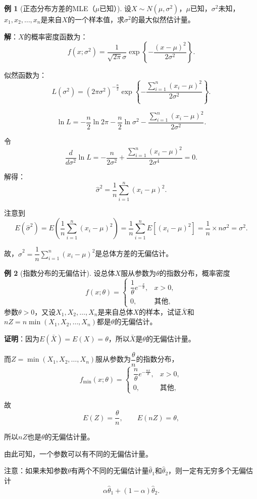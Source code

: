 \documentclass[11pt,a4paper]{report}
\theoremstyle{definition}
\newtheorem{example}{例}[chapter]
\begin{document}
\begin{example}[正态分布方差的MLE（$\mu$已知）]
设$X\sim N(\mu,\sigma^{2})$，$\mu$已知，$\sigma^{2}$未知，$x_{1},x_{2},\ldots,x_{n}$是来自$X$的一个样本值，求$\sigma^{2}$的最大似然估计量。

\textbf{解}：$X$的概率密度函数为：
\[
f(x;\sigma^{2})=\frac{1}{\sqrt{2\pi}\sigma}\exp\left\{-\frac{(x-\mu)^{2}}{2\sigma^{2}}\right\}.
\]

似然函数为：
\[
L(\sigma^{2})=(2\pi\sigma^{2})^{-\frac{n}{2}}\exp\left\{-\frac{\sum_{i=1}^{n}(x_{i}-\mu)^{2}}{2\sigma^{2}}\right\}.
\]

\[
\ln L=-\frac{n}{2}\ln 2\pi-\frac{n}{2}\ln\sigma^{2}-\frac{\sum_{i=1}^{n}(x_{i}-\mu)^{2}}{2\sigma^{2}}.
\]

令
\[
\frac{d}{d\sigma^{2}}\ln L=-\frac{n}{2\sigma^{2}}+\frac{\sum_{i=1}^{n}(x_{i}-\mu)^{2}}{2\sigma^{4}}=0.
\]

解得：
\[
\hat{\sigma}^{2}=\frac{1}{n}\sum_{i=1}^{n}(x_{i}-\mu)^{2}.
\]

注意到
\[
E(\hat{\sigma}^{2})=E\left(\frac{1}{n}\sum_{i=1}^{n}(x_{i}-\mu)^{2}\right)=\frac{1}{n}\sum_{i=1}^{n}E[(x_{i}-\mu)^{2}]=\frac{1}{n}\times n\sigma^{2}=\sigma^{2}.
\]

故，$\hat{\sigma}^{2}=\dfrac{1}{n}\displaystyle\sum_{i=1}^{n}(x_{i}-\mu)^{2}$是总体方差的无偏估计。
\end{example}

\begin{example}[指数分布的无偏估计]
设总体$X$服从参数为$\theta$的指数分布，概率密度
\[
f(x;\theta)=
\begin{cases}
\dfrac{1}{\theta}e^{-\frac{x}{\theta}}, & x>0,\\[0.5em]
0, & \text{其他},
\end{cases}
\]
参数$\theta>0$，又设$X_{1},X_{2},\ldots,X_{n}$是来自总体$X$的样本，试证$\bar{X}$和$nZ=n\min(X_{1},X_{2},\ldots,X_{n})$都是$\theta$的无偏估计。

\textbf{证明}：因为$E(\bar{X})=E(X)=\theta$，所以$\bar{X}$是$\theta$的无偏估计量。

而$Z=\min(X_{1},X_{2},\ldots,X_{n})$服从参数为$\dfrac{\theta}{n}$的指数分布，
\[
f_{\min}(x;\theta)=
\begin{cases}
\dfrac{n}{\theta}e^{-\frac{nx}{\theta}}, & x>0,\\[0.5em]
0, & \text{其他},
\end{cases}
\]

故
\[
E(Z)=\frac{\theta}{n},\qquad E(nZ)=\theta,
\]

所以$nZ$也是$\theta$的无偏估计量。

由此可知，一个参数可以有不同的无偏估计量。

注意：如果未知参数$\theta$有两个不同的无偏估计量$\hat{\theta}_{1}$和$\hat{\theta}_{2}$，则一定有无穷多个无偏估计
\[
\alpha\hat{\theta}_{1}+(1-\alpha)\hat{\theta}_{2}.
\]
\end{example}
\end{document}
